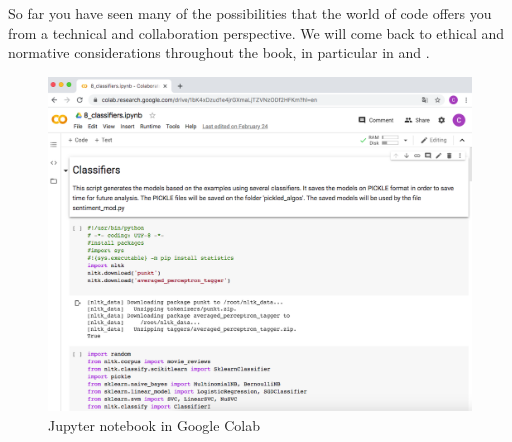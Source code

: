 So far you have seen many of the possibilities that the world of code offers you from a technical and collaboration perspective. We will come back to ethical and normative considerations throughout the book, in particular in  and .

\begin{figure}
\centering
\includegraphics[width=0.9\linewidth]{figures/ch04_colab}
\caption{Jupyter notebook in Google Colab}
\label{fig:colab}
\end{figure}
